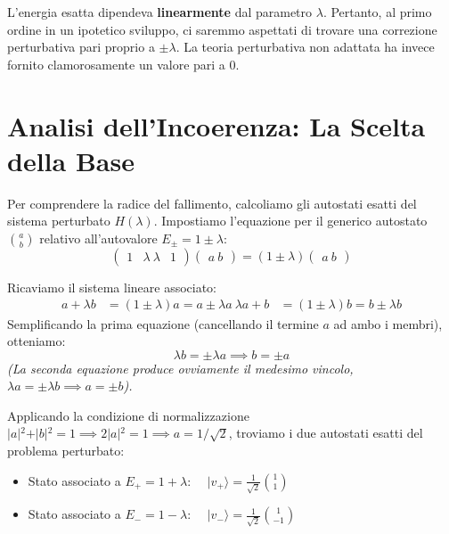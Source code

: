 L'energia esatta dipendeva \textbf{linearmente} dal parametro $\lambda$. Pertanto, al primo ordine in un ipotetico sviluppo, ci saremmo aspettati di trovare una correzione perturbativa pari proprio a $\pm \lambda$. La teoria perturbativa non adattata ha invece fornito clamorosamente un valore pari a $0$.

\section{Analisi dell'Incoerenza: La Scelta della Base}

Per comprendere la radice del fallimento, calcoliamo gli autostati esatti del sistema perturbato $H(\lambda)$.
Impostiamo l'equazione per il generico autostato $\binom{a}{b}$ relativo all'autovalore $E_{\pm} = 1 \pm \lambda$:
\begin{equation}
\begin{pmatrix} 1 & \lambda \ \lambda & 1 \end{pmatrix} \begin{pmatrix} a \ b \end{pmatrix} = (1 \pm \lambda) \begin{pmatrix} a \ b \end{pmatrix}
\end{equation}

Ricaviamo il sistema lineare associato:
\begin{align}
a + \lambda b &= (1 \pm \lambda) a = a \pm \lambda a \
\lambda a + b &= (1 \pm \lambda) b = b \pm \lambda b
\end{align}
Semplificando la prima equazione (cancellando il termine $a$ ad ambo i membri), otteniamo:
\begin{equation}
\lambda b = \pm \lambda a \implies b = \pm a
\end{equation}
\textit{(La seconda equazione produce ovviamente il medesimo vincolo, $\lambda a = \pm \lambda b \implies a = \pm b$).}

Applicando la condizione di normalizzazione $\vert{}a\vert{}^2 + \vert{}b\vert{}^2 = 1 \implies 2\vert{}a\vert{}^2 = 1 \implies a = 1/\sqrt{2}$, troviamo i due autostati esatti del problema perturbato:
\begin{itemize}
\item Stato associato a $E_+ = 1 + \lambda$: $\quad \vert{}v_+\rangle = \frac{1}{\sqrt{2}} \binom{1}{1}$
\item Stato associato a $E_- = 1 - \lambda$: $\quad \vert{}v_-\rangle = \frac{1}{\sqrt{2}} \binom{1}{-1}$
\end{itemize}

